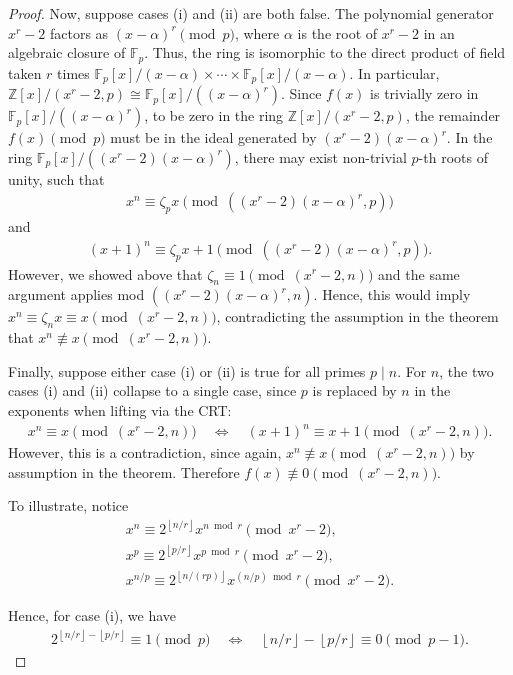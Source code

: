 \documentclass{article}
\theoremstyle{plain}
\theoremstyle{definition}
\newcommand{\floor}[1]{\left\lfloor #1 \right\rfloor}
\newcommand{\Z}{\mathbb{Z}}
\begin{document}
\begin{proof}
Now, suppose cases (i) and (ii) are both false. The polynomial generator $x^r-2$ factors as $(x-\alpha)^r \pmod{p}$, where  $\alpha$ is the root of $x^r-2$ in an algebraic closure of $\mathbb{F}_p$. Thus, the ring is isomorphic to the direct product of field taken $r$ times $\mathbb{F}_p[x]/(x-\alpha) \times \cdots \times \mathbb{F}_p[x]/(x-\alpha)$. In particular, $\Z[x]/(x^r-2, p) \cong \mathbb{F}_p[x]/((x-\alpha)^r)$. Since $f(x)$ is trivially zero in $\mathbb{F}_p[x]/((x-\alpha)^r)$, to be zero in the ring $\Z[x]/(x^r-2, p)$, the remainder $f(x) \pmod{p}$ must be in the ideal generated by $(x^r-2)(x-\alpha)^r$. In the ring $\mathbb{F}_p[x]/((x^r-2)(x-\alpha)^r)$, there may exist non-trivial $p$-th roots of unity, such that
\begin{align*}
    x^n \equiv \zeta_p x \pmod{((x^r-2)(x-\alpha)^r, p)}
\end{align*}
and
\begin{align*}
    (x+1)^n \equiv \zeta_p x + 1 \pmod{((x^r-2)(x-\alpha)^r, p)} .
\end{align*}
However, we showed above that $\zeta_n \equiv 1 \pmod{(x^r-2, n)}$ and the same argument applies mod $((x^r-2)(x-\alpha)^r, n)$. Hence, this would imply $x^n \equiv \zeta_n x \equiv x \pmod{(x^r-2, n)}$, contradicting the assumption in the theorem that $x^n \not\equiv x \pmod{(x^r-2, n)}$.

Finally, suppose either case (i) or (ii) is true for all primes $p \mid n$. For $n$, the two cases (i) and (ii) collapse to a single case, since $p$ is replaced by $n$ in the exponents when lifting via the CRT:
\begin{align*}
x^n \equiv x \pmod{(x^r-2, n)}
\quad\Longleftrightarrow\quad
(x+1)^n \equiv x+1 \pmod{(x^r-2, n)} .
\end{align*}
However, this is a contradiction, since again, $x^n \not\equiv x \pmod{(x^r-2, n)}$ by assumption in the theorem. Therefore $f(x) \not\equiv 0 \pmod{(x^r-2, n)}$.

To illustrate, notice
\begin{align*}
    x^n \equiv 2^{\floor{n/r}} x^{n \bmod r} \pmod{x^r-2} , \\
    x^p \equiv 2^{\floor{p/r}} x^{p \bmod r} \pmod{x^r-2} , \\
    x^{n/p} \equiv 2^{\floor{n/(rp)}} x^{(n/p) \bmod r} \pmod{x^r-2} .
\end{align*}

Hence, for case (i), we have
\begin{align*}
    2^{\floor{n/r} - \floor{p/r}} \equiv 1 \pmod{p} 
    \quad \Longleftrightarrow \quad
    \floor{n/r} - \floor{p/r} \equiv 0 \pmod{p-1} .
\end{align*}


\end{proof}
\end{document}
